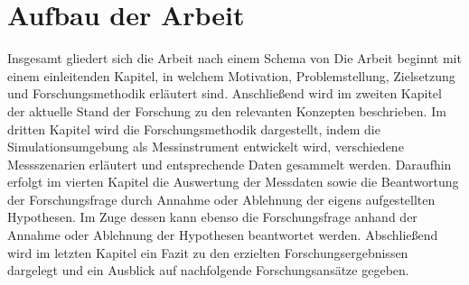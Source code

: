 \section{Aufbau der Arbeit}

Insgesamt gliedert sich die Arbeit nach einem Schema von \cite[]{Holzweiig.2022}
Die Arbeit beginnt mit einem einleitenden Kapitel, in welchem Motivation, Problemstellung, Zielsetzung und Forschungsmethodik erläutert sind.
Anschließend wird im zweiten Kapitel der aktuelle Stand der Forschung zu den relevanten Konzepten beschrieben.
Im dritten Kapitel wird die Forschungsmethodik dargestellt, indem die Simulationsumgebung als Messinstrument entwickelt wird, verschiedene Messszenarien erläutert und entsprechende Daten gesammelt werden. 
Daraufhin erfolgt im vierten Kapitel die Auswertung der Messdaten sowie die Beantwortung der Forschungsfrage durch Annahme oder Ablehnung der eigens aufgestellten Hypothesen.
Im Zuge dessen kann ebenso die Forschungsfrage anhand der Annahme oder Ablehnung der Hypothesen beantwortet werden.
Abschließend wird im letzten Kapitel ein Fazit zu den erzielten Forschungsergebnissen dargelegt und ein Ausblick auf nachfolgende Forschungsansätze gegeben.